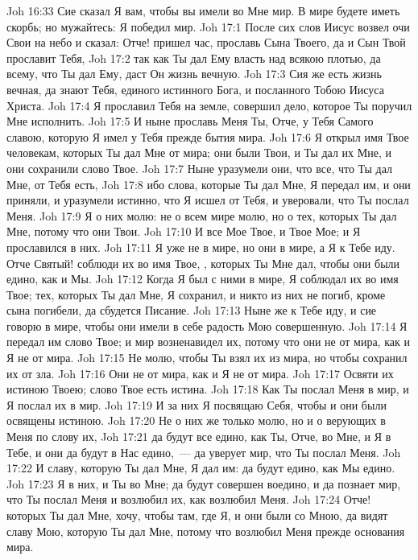 \vs Joh 16:33 Сие сказал Я вам, чтобы вы имели во Мне мир. В мире будете иметь скорбь; но мужайтесь: Я победил мир.
\vs Joh 17:1 После сих слов Иисус возвел очи Свои на небо и сказал: Отче! пришел час, прославь Сына Твоего, да и Сын Твой прославит Тебя,
\vs Joh 17:2 так как Ты дал Ему власть над всякою плотью, да всему, что Ты дал Ему, даст Он жизнь вечную.
\vs Joh 17:3 Сия же есть жизнь вечная, да знают Тебя, единого истинного Бога, и посланного Тобою Иисуса Христа.
\vs Joh 17:4 Я прославил Тебя на земле, совершил дело, которое Ты поручил Мне исполнить.
\vs Joh 17:5 И ныне прославь Меня Ты, Отче, у Тебя Самого славою, которую Я имел у Тебя прежде бытия мира.
\vs Joh 17:6 Я открыл имя Твое человекам, которых Ты дал Мне от мира; они были Твои, и Ты дал их Мне, и они сохранили слово Твое.
\vs Joh 17:7 Ныне уразумели они, что все, что Ты дал Мне, от Тебя есть,
\vs Joh 17:8 ибо слова, которые Ты дал Мне, Я передал им, и они приняли, и уразумели истинно, что Я исшел от Тебя, и уверовали, что Ты послал Меня.
\vs Joh 17:9 Я о них молю: не о всем мире молю, но о тех, которых Ты дал Мне, потому что они Твои.
\vs Joh 17:10 И все Мое Твое, и Твое Мое; и Я прославился в них.
\vs Joh 17:11 Я уже не в мире, но они в мире, а Я к Тебе иду. Отче Святый! соблюди их во имя Твое, , которых Ты Мне дал, чтобы они были едино, как и Мы.
\vs Joh 17:12 Когда Я был с ними в мире, Я соблюдал их во имя Твое; тех, которых Ты дал Мне, Я сохранил, и никто из них не погиб, кроме сына погибели, да сбудется Писание.
\vs Joh 17:13 Ныне же к Тебе иду, и сие говорю в мире, чтобы они имели в себе радость Мою совершенную.
\vs Joh 17:14 Я передал им слово Твое; и мир возненавидел их, потому что они не от мира, как и Я не от мира.
\vs Joh 17:15 Не молю, чтобы Ты взял их из мира, но чтобы сохранил их от зла.
\vs Joh 17:16 Они не от мира, как и Я не от мира.
\vs Joh 17:17 Освяти их истиною Твоею; слово Твое есть истина.
\vs Joh 17:18 Как Ты послал Меня в мир,  и Я послал их в мир.
\vs Joh 17:19 И за них Я посвящаю Себя, чтобы и они были освящены истиною.
\vs Joh 17:20 Не о них же только молю, но и о верующих в Меня по слову их,
\vs Joh 17:21 да будут все едино, как Ты, Отче, во Мне, и Я в Тебе,  и они да будут в Нас едино,~--- да уверует мир, что Ты послал Меня.
\vs Joh 17:22 И славу, которую Ты дал Мне, Я дал им: да будут едино, как Мы едино.
\vs Joh 17:23 Я в них, и Ты во Мне; да будут совершен воедино, и да познает мир, что Ты послал Меня и возлюбил их, как возлюбил Меня.
\vs Joh 17:24 Отче! которых Ты дал Мне, хочу, чтобы там, где Я, и они были со Мною, да видят славу Мою, которую Ты дал Мне, потому что возлюбил Меня прежде основания мира.
